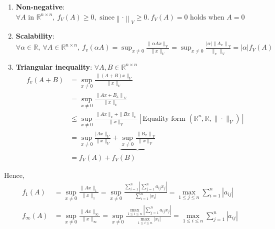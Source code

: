 \documentclass{article}
\theoremstyle{definition} %
\newcommand{\RR}{\mathbb{R}}
\begin{document}
\begin{enumerate}[label=(\alph*)]
	\item \textbf{Non-negative}: $
	\forall A \text { in } \mathbb{R}^{n \times n}, \ f_V(A) \geqslant 0, \text{ since}\left\| \cdot\right\|_V \geqslant 0 .\ f_V(A)=0 \text { holds when } A=0
	$
	\item \textbf{Scalability}: $
	\forall \alpha \in \mathbb{R}, \ \forall A \in \mathbb{R}^{n \times n}, \ f_v(\alpha A)=\sup _{x \neq 0} \frac{\|\alpha A x\|_V}{\|x\|_V}=\sup _{x \neq 0} \frac{|\alpha|\left\|A_x\right\|_V}{\|_x \|_V}=|\alpha| f_V(A)
	$
	\item \textbf{Triangular inequality}: $\forall A, B \in \mathbb{R}^{n\times n}$
	\begin{align*}
		f_v(A+B)&=\sup _{x\neq 0} \frac{\|(A+B) x\|_V}{\|x\|_V}\\
		&=\sup  _{x\neq 0} \frac{\left\|A x+B_x\right\|_V}{\|x\|_V}\\
		&\leq \sup  _{x\neq 0} \frac{\|A x\|_V+\|Bx \|_V}{\|x\|_V} \left[\text {Equality form }\left(\RR^n, \mathbb{R},\|\cdot\|_V\right)\right]\\
		&=\sup  _{x\neq 0} \frac{\mid A x \|_V}{\|x\|_V}+\underbrace{\sup _{x\neq 0} \frac{\left\|B_x\right\|_V}{\|x\|_V}}\\
		&=f_V(A)+f_V(B)
		\end{align*}
\end{enumerate}

Hence, 
\begin{align*}
	f_1(A) &= \sup _{x\neq 0} \frac{\|A x\|_1}{\| x\|_1}=\sup_{x\neq 0} \frac{\sum_{i=1}^n\left|\sum_{j=1}^n a_{i j} x_j\right|}{\sum_{i=1}^n\left|x_i\right|}=\max _{1 \leq j \leq n} \sum_{i=1}^n\left|a_{i j}\right|
	\\
	f_{\infty}(A) &= \sup _{x\neq 0} \frac{\|A x\|_{\infty}}{\| x\|_{\infty}}=\sup_{x\neq 0} \frac{\max_{1\le i \le n}\left|\sum_{j=1}^n a_{i j} x_j\right|}{\max_{1\le i \le n}\left|x_i\right|}=\max _{1 \leq i \leq n} \sum_{j=1}^n\left|a_{i j}\right|
\end{align*}
\end{document}
